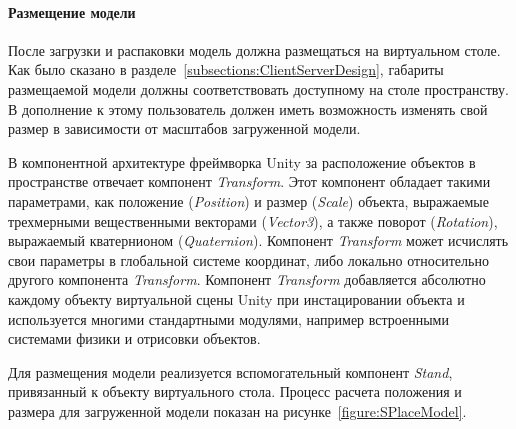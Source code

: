 ﻿\paragraph{Размещение модели}

После загрузки и распаковки модель должна размещаться на виртуальном столе.
Как было сказано в разделе~\ref{subsections:ClientServerDesign},
габариты размещаемой модели должны соответствовать доступному на столе пространству.
В дополнение к этому пользователь должен иметь возможность изменять
свой размер в зависимости от масштабов загруженной модели.

В компонентной архитектуре фреймворка Unity за расположение объектов
в пространстве отвечает компонент \emph{Transform}.
Этот компонент обладает такими параметрами, как
положение (\emph{Position}) и размер (\emph{Scale}) объекта,
выражаемые трехмерными вещественными векторами (\emph{Vector3}),
а также поворот (\emph{Rotation}), выражаемый кватернионом (\emph{Quaternion}).
Компонент \emph{Transform} может исчислять свои параметры
в глобальной системе координат, либо локально
относительно другого компонента \emph{Transform}.
Компонент \emph{Transform} добавляется абсолютно каждому объекту
виртуальной сцены Unity при инстацировании объекта
и используется многими стандартными модулями,
например встроенными системами физики и отрисовки объектов.%
\cite{DocUnity}

Для размещения модели реализуется вспомогательный компонент \emph{Stand},
привязанный к объекту виртуального стола. Процесс расчета положения
и размера для загруженной модели показан на рисунке~\ref{figure:SPlaceModel}.

